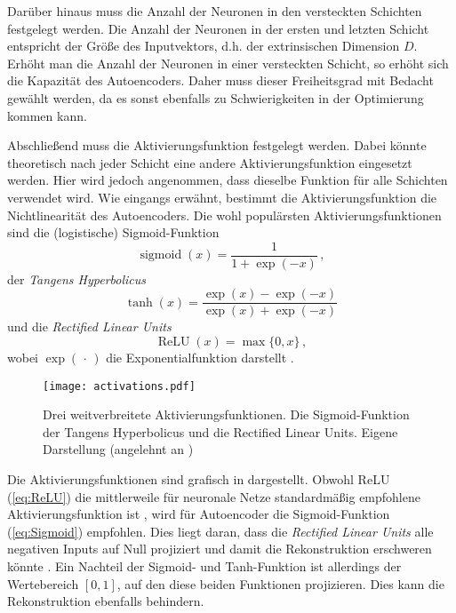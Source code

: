 Darüber hinaus muss die Anzahl der Neuronen in den versteckten Schichten festgelegt werden. Die
Anzahl der Neuronen in der ersten und letzten Schicht entspricht der Größe des Inputvektors, d.h.
der extrinsischen Dimension $D$. Erhöht man die Anzahl der Neuronen in einer versteckten Schicht,
so erhöht sich die Kapazität des Autoencoders. Daher muss dieser Freiheitsgrad mit Bedacht gewählt
werden, da es sonst ebenfalls zu Schwierigkeiten in der Optimierung kommen kann.

Abschließend muss die Aktivierungsfunktion festgelegt werden. Dabei könnte theoretisch nach jeder
Schicht eine andere Aktivierungsfunktion eingesetzt werden. Hier wird jedoch angenommen, dass
dieselbe Funktion für alle Schichten verwendet wird. Wie eingangs erwähnt, bestimmt die
Aktivierungsfunktion die Nichtlinearität des Autoencoders. Die wohl populärsten
Aktivierungsfunktionen sind die (logistische) Sigmoid-Funktion
\begin{equation}
	\label{eq:Sigmoid}
	\operatorname{sigmoid}(x) = \frac{1}{1 + \exp (-x)} \, ,
\end{equation}
der \textit{Tangens Hyperbolicus}
\begin{equation}
	\label{eq:tanh}
	\operatorname{tanh}(x) = \frac{\exp(x) - \exp(-x)}{\exp(x) + \exp(-x)}
\end{equation}
und die \textit{Rectified Linear Units}
\begin{equation}
	\label{eq:ReLU}
	\operatorname{ReLU}(x) = \max\{0, x\} \, ,
\end{equation}
wobei $\exp(\, \cdot \,)$ die Exponentialfunktion darstellt \parencites[191 -- 195]{Goodfellow.2016}[4]{Charte.2018}.
\begin{figure}[h]
	\centering
	\texttt{[image: activations.pdf]}
	\caption[Drei weitverbreitete Aktivierungsfunktionen.]{Drei weitverbreitete Aktivierungsfunktionen. \captiona Die Sigmoid-Funktion \captionb der Tangens Hyperbolicus und \captionc die Rectified Linear Units. Eigene Darstellung (angelehnt an \textcite[4]{Charte.2018})}
	\label{fig:activations}
\end{figure}
Die Aktivierungsfunktionen sind grafisch in  dargestellt.
Obwohl ReLU (\eqref{eq:ReLU}) die mittlerweile für neuronale Netze standardmäßig empfohlene Aktivierungsfunktion ist \parencite[195]{Goodfellow.2016}, wird für Autoencoder die Sigmoid-Funktion (\eqref{eq:Sigmoid})
empfohlen. Dies liegt daran, dass die \textit{Rectified Linear Units} alle negativen Inputs auf
Null projiziert und damit die Rekonstruktion erschweren könnte \parencite[4]{Charte.2018}. Ein Nachteil der Sigmoid- und Tanh-Funktion ist allerdings der Wertebereich
$[0, 1]$, auf den diese beiden Funktionen projizieren. Dies kann die Rekonstruktion ebenfalls
behindern.
